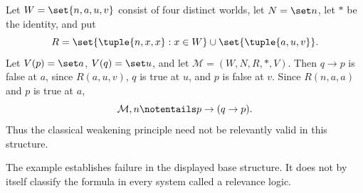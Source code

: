 \begin{example}
Let \(W=\set{n,a,u,v}\) consist of four distinct worlds, let \(N=\set n\),
let \({*}\) be the identity, and put
\[
  R=\set{\tuple{n,x,x}:x\in W}\cup\set{\tuple{a,u,v}}.
\]
Let \(V(p)=\set a\), \(V(q)=\set u\), and let
\(\mathcal M=(W,N,R,{*},V)\).  Then \(q\to p\) is false at \(a\), since
\(R(a,u,v)\), \(q\) is true at \(u\), and \(p\) is false at \(v\).  Since
\(R(n,a,a)\) and \(p\) is true at \(a\),
\[
  \mathcal M,n\notentails p\to(q\to p).
\]
Thus the classical weakening principle need not be relevantly valid in this
structure.
\end{example}

The example establishes failure in the displayed base structure.  It does not
by itself classify the formula in every system called a relevance logic.

